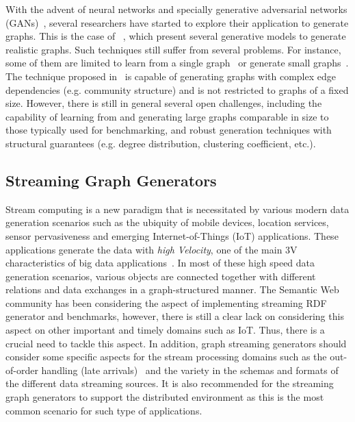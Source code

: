 With the advent of neural networks and specially generative adversarial networks
(GANs)~\cite{goodfellow2014generative}, several researchers have started to
explore their application to generate graphs. This is the case of
~\cite{kipf2016variational,grover2018graphite,simonovsky2018graphvae,li2018learning,you2018graphrnn},
which present several generative models to generate realistic graphs.  Such
techniques still suffer from several problems. For instance, some of them are
limited to learn from a single
graph~\cite{kipf2016variational,grover2018graphite} or generate small
graphs~\cite{simonovsky2018graphvae,li2018learning,you2018graphrnn}. The
technique proposed in~\cite{you2018graphrnn} is capable of generating graphs
with complex edge dependencies (e.g. community structure) and is not restricted
to graphs of a fixed size. However, there is still in general several open
challenges, including the capability of learning from and generating large graphs comparable
in size to those typically used for benchmarking, and robust generation
techniques with structural guarantees (e.g. degree distribution, clustering
coefficient, etc.).


\subsection{Streaming Graph Generators}
Stream computing is a new paradigm that is necessitated by various modern data generation scenarios such as the ubiquity of mobile devices, location services, 
sensor pervasiveness and emerging Internet-of-Things (IoT) applications. These applications generate the data with \emph{high Velocity}, one of the main 3V characteristics of big data applications~\cite{sakr2016big}. In most of these high speed data generation scenarios, various objects are connected together with different relations and data exchanges  in a graph-structured manner. The Semantic Web community has been considering the aspect of implementing streaming RDF generator and benchmarks, however, there is still a clear lack on considering this aspect on other important and timely domains such as IoT. Thus, there is a crucial need to tackle this aspect. In addition, graph streaming generators should  consider some specific aspects for the stream processing domains such as the out-of-order handling (late arrivals)~\cite{li2008out} and the variety in the schemas and formats of the different data streaming sources. It is also recommended for the streaming graph generators to support the distributed environment as this is the most common scenario for such type of applications. 